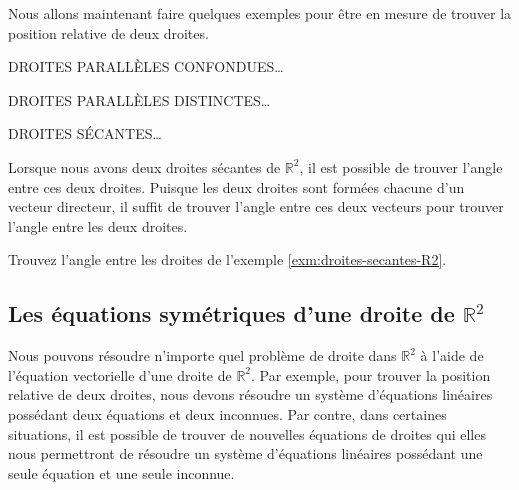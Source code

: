 \documentclass[]{book}
\theoremstyle{definition}
\theoremstyle{definition}
\theoremstyle{definition}
\theoremstyle{remark}
\let\BeginKnitrBlock\begin \let\EndKnitrBlock\end
\begin{document}
Nous allons maintenant faire quelques exemples pour être en mesure de trouver la position relative de deux droites.

\BeginKnitrBlock{example}
\protect\hypertarget{exm:unnamed-chunk-200}{}{\label{exm:unnamed-chunk-200} }DROITES PARALLÈLES CONFONDUES\ldots{}
\EndKnitrBlock{example}

\BeginKnitrBlock{example}
\protect\hypertarget{exm:unnamed-chunk-201}{}{\label{exm:unnamed-chunk-201} }DROITES PARALLÈLES DISTINCTES\ldots{}
\EndKnitrBlock{example}

\BeginKnitrBlock{example}
\protect\hypertarget{exm:droites-secantes-R2}{}{\label{exm:droites-secantes-R2} }DROITES SÉCANTES\ldots{}
\EndKnitrBlock{example}

Lorsque nous avons deux droites sécantes de \(\mathbb{R}^2\), il est possible de trouver l'angle entre ces deux droites. Puisque les deux droites sont formées chacune d'un vecteur directeur, il suffit de trouver l'angle entre ces deux vecteurs pour trouver l'angle entre les deux droites.

\BeginKnitrBlock{example}
\protect\hypertarget{exm:unnamed-chunk-202}{}{\label{exm:unnamed-chunk-202} }Trouvez l'angle entre les droites de l'exemple \ref{exm:droites-secantes-R2}.
\EndKnitrBlock{example}

\hypertarget{les-uxe9quations-symuxe9triques-dune-droite-de-mathbbr2}{%
\subsection{\texorpdfstring{Les équations symétriques d'une droite de \(\mathbb{R}^2\)}{Les équations symétriques d'une droite de \textbackslash{}mathbb\{R\}\^{}2}}\label{les-uxe9quations-symuxe9triques-dune-droite-de-mathbbr2}}

Nous pouvons résoudre n'importe quel problème de droite dans \(\mathbb{R}^2\) à l'aide de l'équation vectorielle d'une droite de \(\mathbb{R}^2\).
Par exemple, pour trouver la position relative de deux droites, nous devons résoudre un système d'équations linéaires possédant deux équations et deux inconnues. Par contre, dans certaines situations, il est possible de trouver de nouvelles équations de droites qui elles nous permettront de résoudre un système d'équations linéaires possédant une seule équation et une seule inconnue.
\end{document}
